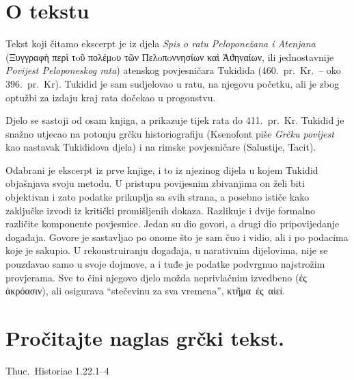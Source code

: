 


\section*{O tekstu}

Tekst koji čitamo ekscerpt je iz djela \textit{Spis o ratu Peloponežana i Atenjana} \textgreek[variant=ancient]{(Ξυγγραφὴ περὶ τoῦ πολέμoυ τῶν Пελoπoννησίων καὶ Ἀϑηναίων,} ili jednostavnije \textit{Povijest Peloponeskog rata}) atenskog povjesničara Tukidida (460.\ pr.~Kr.\ – oko 396.\ pr.~Kr). Tukidid je sam sudjelovao u ratu, na njegovu početku, ali je zbog optužbi za izdaju kraj rata dočekao u progonstvu. 

Djelo se sastoji od osam knjiga, a prikazuje tijek rata do 411.\ pr.~Kr. Tukidid je snažno utjecao na potonju grčku historiografiju (Ksenofont piše \textit{Grčku povijest} kao nastavak Tukididova djela) i na rimske povjesničare (Salustije, Tacit).

Odabrani je ekscerpt iz prve knjige, i to iz njezinog dijela u kojem Tukidid objašnjava svoju metodu. U pristupu povijesnim zbivanjima on želi biti objektivan i zato podatke prikuplja sa svih strana, a posebno ističe kako zaključke izvodi iz kritički promišljenih dokaza. Razlikuje i dvije formalno različite komponente povjesnice. Jedan su dio govori, a drugi dio pripovijedanje događaja. Govore je sastavljao po onome što je sam čuo i vidio, ali i po podacima koje je sakupio. U rekonstruiranju događaja, u narativnim dijelovima, nije se pouzdavao samo u svoje dojmove, a i tuđe je podatke podvrgnuo najstrožim provjerama. Sve to čini njegovo djelo možda neprivlačnim izvedbeno \textgreek[variant=ancient]{(ἐς ἀκρόασιν)}, ali osigurava ``stečevinu za sva vremena'', \textgreek[variant=ancient]{κτῆμα ἐς αἰεί.}

\newpage

\section*{Pročitajte naglas grčki tekst.}

Thuc.\ Historiae 1.22.1–4


\medskip


